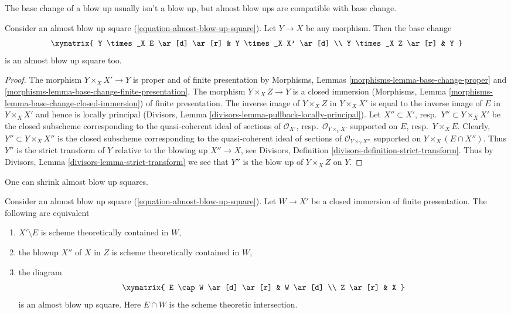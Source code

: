 \medskip\noindent
The base change of a blow up usually isn't a blow up,
but almost blow ups are compatible with base change.

\begin{lemma}
\label{lemma-base-change-almost-blow-up}
Consider an almost blow up square (\ref{equation-almost-blow-up-square}).
Let $Y \to X$ be any morphism. Then the base change
$$
\xymatrix{
Y \times_X E \ar[d] \ar[r] & Y \times_X X' \ar[d] \\
Y \times_X Z \ar[r] & Y
}
$$
is an almost blow up square too.
\end{lemma}

\begin{proof}
The morphism $Y \times_X X' \to Y$ is proper and of finite presentation
by Morphisms, Lemmas \ref{morphisms-lemma-base-change-proper} and
\ref{morphisms-lemma-base-change-finite-presentation}.
The morphism $Y \times_X Z \to Y$ is a closed immersion
(Morphisms, Lemma \ref{morphisms-lemma-base-change-closed-immersion}) of
finite presentation. The inverse image of $Y \times_X Z$ in $Y \times_X X'$
is equal to the inverse image of $E$ in $Y \times_X X'$ and hence is
locally principal
(Divisors, Lemma \ref{divisors-lemma-pullback-locally-principal}).
Let $X'' \subset X'$, resp.\ $Y'' \subset Y \times_X X'$ be the closed
subscheme corresponding to the quasi-coherent ideal of sections of
$\mathcal{O}_{X'}$, resp.\ $\mathcal{O}_{Y \times_Y X'}$
supported on $E$, resp.\ $Y \times_X E$.
Clearly, $Y'' \subset Y \times_X X''$ is the closed subscheme
corresponding to the quasi-coherent ideal of sections of
$\mathcal{O}_{Y \times_Y X''}$ supported on $Y \times_X (E \cap X'')$.
Thus $Y''$ is the strict transform of $Y$ relative to the blowing up
$X'' \to X$, see
Divisors, Definition \ref{divisors-definition-strict-transform}.
Thus by Divisors, Lemma \ref{divisors-lemma-strict-transform}
we see that $Y''$ is the blow up of $Y \times_X Z$ on $Y$.
\end{proof}

\noindent
One can shrink almost blow up squares.

\begin{lemma}
\label{lemma-shrink-almost-blow-up}
Consider an almost blow up square (\ref{equation-almost-blow-up-square}).
Let $W \to X'$ be a closed immersion of finite presentation.
The following are equivalent
\begin{enumerate}
\item $X' \setminus E$ is scheme theoretically contained in $W$,
\item the blowup $X''$ of $X$ in $Z$ is scheme theoretically contained in $W$,
\item the diagram
$$
\xymatrix{
E \cap W \ar[d] \ar[r] & W \ar[d] \\
Z \ar[r] & X
}
$$
is an almost blow up square. Here $E \cap W$ is the
scheme theoretic intersection.
\end{enumerate}
\end{lemma}

